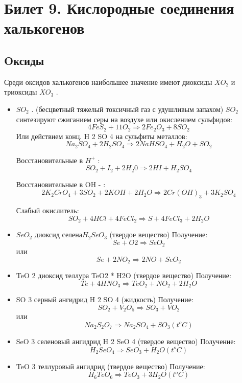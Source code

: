 \documentclass[11pt]{article}
\begin{document}
\section{Билет 9. Кислородные соединения халькогенов}

\subsection{Oксиды}
Среди оксидов халькогенов наибольшее значение имеют диоксиды    $XO _2$ и триоксиды $XO_3$ .

\begin{itemize}
\item $SO _2$ . (бесцветный тяжелый токсичный газ с удушливым запахом)
$SO _2$ синтезируют сжиганием серы на воздухе или окислением сульфидов:
$$4FeS _2 + 11O _2 \Rightarrow 2Fe _2 O _3 + 8SO _2$$
Или действием конц. H 2 SO 4 на сульфиты металлов:
$$Na _2 SO _4 + 2H _2 SO _4 \Rightarrow 2NaHSO _4 + H _2 O + SO _2$$

Восстановительные в $H ^+$ :
$$SO _2 + I _2 + 2H_2 0 \Rightarrow 2HI + H _2 SO _4$$

Восстановительные в OH - :
$$2K _2 CrO _4 + 3SO _2 + 2 KOH + 2H _2 O \Rightarrow 2Cr(OH) _3 + 3K _2 SO _4$$

Слабый окислитель:
$$SO _2 + 4 HCl + 4 FeCl _2 \Rightarrow S + 4FeCl _3 + 2H _2 O$$

\item $SeO _2$ диоксид селена$ H _2 SeO _3$ (твердое вещество)
Получение:
$$Se + O 2 \Rightarrow SeO _2$$ или $$Se + 2NO _2 \Rightarrow 2NO + SeO _2$$
\item TeO 2 диоксид теллура TeO2 * H2O (твердое вещество)
Получение:
$$Te + 4HNO _3 \Rightarrow TeO _2 + NO _2 + 2H _2 O$$

\item SO 3 серный ангидрид H 2 SO 4 (жидкость)
Получение:
$$SO _2 + V _2 O _5 \Rightarrow SO _3 + VO _2$$ или $$Na _2 S _2 O _7 \Rightarrow Na _2 SO _4 + SO _3(t^oC)$$

\item  SeO 3 селеновый ангидрид H 2 SeO 4 (твердое вещество)
Получение:
$$H _2 SeO _4 \Rightarrow SeO _3 + H _2 O(t^oC)$$

\item TeO 3 теллуровый ангидрид (твердое вещество)
Получение:
$$H _6 TeO _6 \Rightarrow TeO _3 + 3H _2 O(t^oC)$$
\end{itemize}
\end{document}
